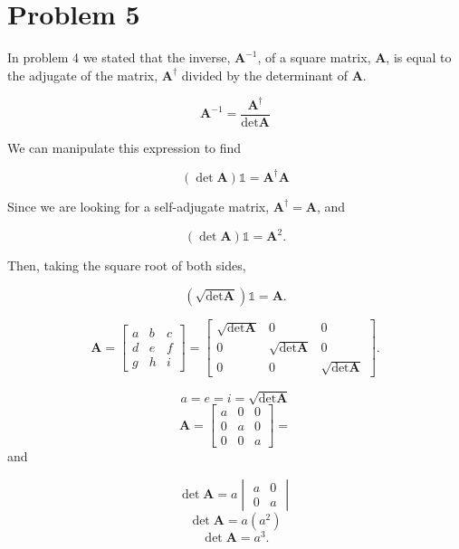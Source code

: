 \documentclass{article}
\begin{document}

\section*{Problem 5}

In problem 4 we stated that the inverse, $\textbf{A}^{-1}$, of a square matrix, $\textbf{A}$,  is equal to the adjugate of the matrix, $\textbf{A}^{\dagger}$ divided by the determinant of $\textbf{A}$.

$$ \textbf{A}^{-1} = \frac{\textbf{A}^{\dagger}}{\det{\textbf{A}}} $$

We can manipulate this expression to find

$$ (\det{\textbf{A}})\mathbb{1} = \textbf{A}^{\dagger}\textbf{A} $$

Since we are looking for a self-adjugate matrix, $\textbf{A}^{\dagger} = \textbf{A}$, and 

$$ (\det{\textbf{A}})\mathbb{1} = \textbf{A}^2 .$$

Then, taking the square root of both sides,

$$ \left(\sqrt{\det{\textbf{A}}}\right)\mathbb{1} = \textbf{A} .$$

$$ \textbf{A} = \begin{bmatrix} a & b & c \\
                                d & e & f \\
                                g & h & i \end{bmatrix} =
                \begin{bmatrix} \sqrt{\det{\textbf{A}}} & 0 & 0 \\
                                0 & \sqrt{\det{\textbf{A}}} & 0 \\
                                0 & 0 & \sqrt{\det{\textbf{A}}} \end{bmatrix}. $$
                
$$ a = e = i = \sqrt{\det{\textbf{A}}} $$
$$ \textbf{A} = \begin{bmatrix} a & 0 & 0 \\
                                0 & a & 0 \\
                                0 & 0 & a \end{bmatrix} = $$
and

$$ \det{\textbf{A}} = a \begin{vmatrix} a & 0 \\ 0 & a \end{vmatrix} $$
$$ \det{\textbf{A}} = a (a^2) $$
$$ \det{\textbf{A}} = a^3 .$$
\end{document}
